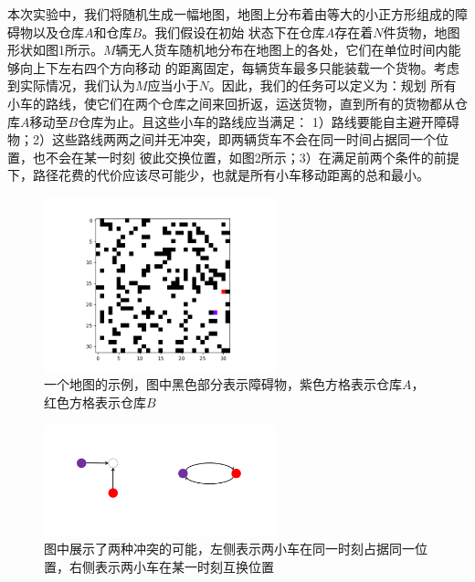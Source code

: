 \documentclass[UTF8]{ctexart}  %
\begin{document}
本次实验中，我们将随机生成一幅地图，地图上分布着由等大的小正方形组成的障碍物以及仓库$A$和仓库$B$。我们假设在初始
状态下在仓库$A$存在着$N$件货物，地图形状如图1所示。$M$辆无人货车随机地分布在地图上的各处，它们在单位时间内能够向上下左右四个方向移动
的距离固定，每辆货车最多只能装载一个货物。考虑到实际情况，我们认为$M$应当小于$N$。因此，我们的任务可以定义为：规划
所有小车的路线，使它们在两个仓库之间来回折返，运送货物，直到所有的货物都从仓库$A$移动至$B$仓库为止。且这些小车的路线应当满足：
1）路线要能自主避开障碍物；2）这些路线两两之间并无冲突，即两辆货车不会在同一时间占据同一个位置，也不会在某一时刻
彼此交换位置，如图2所示；3）在满足前两个条件的前提下，路径花费的代价应该尽可能少，也就是所有小车移动距离的总和最小。


\begin{figure}[H]
    \centering
    \centering
    \includegraphics[width=0.6\textwidth, keepaspectratio]{fig1.png}
    \captionsetup{font=footnotesize}
    \caption{一个地图的示例，图中黑色部分表示障碍物，紫色方格表示仓库$A$，红色方格表示仓库$B$}
    \label{figure1}
\end{figure}

\begin{figure}[H]
    \centering
    \centering
    \includegraphics[width=0.6\textwidth, keepaspectratio]{fig2.png}
    \captionsetup{font=footnotesize}
    \caption{图中展示了两种冲突的可能，左侧表示两小车在同一时刻占据同一位置，右侧表示两小车在某一时刻互换位置}
    \label{figure1}
\end{figure}

\end{document}
